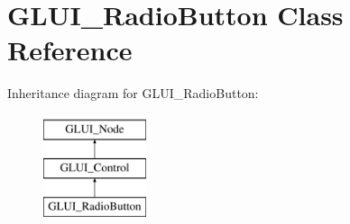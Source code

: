 \hypertarget{classGLUI__RadioButton}{\section{G\-L\-U\-I\-\_\-\-Radio\-Button Class Reference}
\label{classGLUI__RadioButton}
}
Inheritance diagram for G\-L\-U\-I\-\_\-\-Radio\-Button\-:\begin{figure}[H]
\begin{center}
\leavevmode
\includegraphics[height=3.000000cm]{classGLUI__RadioButton}
\end{center}
\end{figure}
